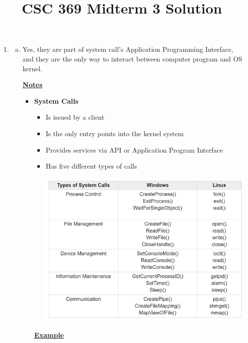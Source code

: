 \documentclass[12pt]{article}
\begin{document}
\title{CSC 369 Midterm 3 Solution}

\bigskip

\begin{enumerate}[1.]
    \item

    \begin{enumerate}[a)]

        \item
        Yes, they are part of system call's Application Programming Interface,
        and they are the only way to interact between computer program and OS kernel.
        \bigskip

        \underline{\textbf{Notes}}

        \begin{itemize}
            \item \textbf{System Calls}
            \begin{itemize}
                \item Is issued by a client
                \item Is the only entry points into the kernel system
                \item Provides services via API or Application Program Interface
                \item Has five different types of calls

                \begin{center}
                \includegraphics[width=0.8\linewidth]{../images/midterm_3_solution_1.png}
                \end{center}
            \end{itemize}

            \bigskip

            \underline{\textbf{Example}}


\end{itemize}
\end{enumerate}
\end{enumerate}
\end{document}
